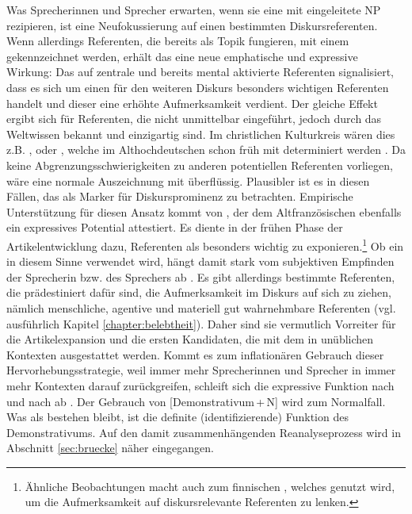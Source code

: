 Was Sprecherinnen und Sprecher erwarten, wenn sie eine mit  eingeleitete NP  rezipieren, ist eine Neufokussierung auf einen bestimmten Diskursreferenten. Wenn allerdings Referenten, die bereits als Topik  fungieren, mit einem  gekennzeichnet werden, erhält das  eine neue emphatische und expressive Wirkung: Das  auf zentrale und bereits mental aktivierte Referenten signalisiert, dass es sich um einen für den weiteren Diskurs besonders wichtigen Referenten handelt und dieser eine erhöhte Aufmerksamkeit verdient. Der gleiche Effekt ergibt sich für Referenten, die nicht unmittelbar eingeführt, jedoch durch das Weltwissen bekannt und einzigartig sind. Im christlichen Kulturkreis wären dies z.B. ,  oder , welche im Althochdeutschen schon früh mit  determiniert werden \parencite{Oubouzar1989}. Da keine Abgrenzungsschwierigkeiten zu anderen potentiellen Referenten vorliegen,  wäre eine normale Auszeichnung mit  überflüssig. Plausibler ist es in diesen Fällen, das  als Marker für Diskursprominenz zu betrachten. Empirische Unterstützung für diesen Ansatz kommt von \textcite{Epstein1993,Epstein1994}, der dem Altfranzösischen  ebenfalls ein expressives Potential attestiert. Es diente in der frühen Phase der Artikelentwicklung dazu, Referenten als besonders wichtig zu exponieren.\footnote{Ähnliche Beobachtungen macht auch \textcite{Laury1997} zum finnischen  , welches genutzt wird, um die Aufmerksamkeit auf diskursrelevante Referenten zu lenken.} 
Ob ein  in diesem Sinne verwendet wird, hängt damit stark vom subjektiven Empfinden der Sprecherin bzw. des Sprechers ab \parencite[128]{Epstein1993}. Es gibt allerdings bestimmte Referenten, die prädestiniert dafür sind, die Aufmerksamkeit im Diskurs auf sich zu ziehen, nämlich menschliche, agentive und materiell gut wahrnehmbare Referenten (vgl. ausführlich Kapitel \ref{chapter:belebtheit}). Daher sind sie vermutlich Vorreiter für die Artikelexpansion  und die ersten Kandidaten, die mit dem  in unüblichen Kontexten ausgestattet werden. Kommt es zum inflationären Gebrauch dieser Hervorhebungsstrategie, weil immer mehr Sprecherinnen und Sprecher in immer mehr Kontexten darauf zurückgreifen, schleift sich die expressive Funktion nach und nach ab \parencite[vgl. das Prinzip der unsichtbaren Hand nach][]{Keller1994}. Der Gebrauch von [Demonstrativum\,+\,N] wird zum Normalfall. Was als  bestehen bleibt, ist die definite (identifizierende) Funktion des  Demonstrativums.  Auf den damit zusammenhängenden Reanalyseprozess  wird in Abschnitt \ref{sec:bruecke} näher eingegangen.  

